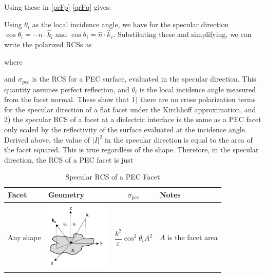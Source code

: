 Using these in \eqref{prFp}-\eqref{qrFq} gives:

Using $\theta_i$ as the local incidence angle, we have for the specular direction $\cos\theta_i = -\hat{n} \cdot \hat{k}_i$ and $\cos\theta_i  = \hat{n} \cdot \hat{k}_r$. Substituting these and simplifying, we can write the polarized RCSs as

\noindent where 

and $\sigma_{pec}$ is the RCS for a PEC surface, evaluated in the specular direction. This quantity assumes perfect reflection, and $\theta_i$ is the local incidence angle measured from the facet normal. These show that 1) there are no cross polarization terms for the specular direction of a flat facet under the Kirchhoff approximation, and 2) the specular RCS of a facet at a dielectric interface is the same as a PEC facet only scaled by the reflectivity of the surface evaluated at the incidence angle.  Derived above, the value of $\vert I\vert^2$ in the specular direction is equal to the area of the facet squared. This is true regardless of the shape. Therefore, in the specular direction, the RCS of a PEC facet is just 

\begin{table}[h]
\caption{Specular RCS of a PEC Facet}
\begin{center}
\begin{tabular}{|p{1.8cm}|p{3.2cm}|c|p{2.7cm}|}
\hline
Facet & Geometry & $\sigma_{pec}$ & Notes \\
\hline
Any shape & \parbox[c]{1em}{\includegraphics[width=1.2in]{Kirchhoff/Figures/Specular}}  & $\dfrac{k^2}{\pi} \cos^2\theta_i A^2$ & $A$ is the facet area \\   \hline
\end{tabular}
\label{tablePECspecRCS}
\end{center}
\end{table}


